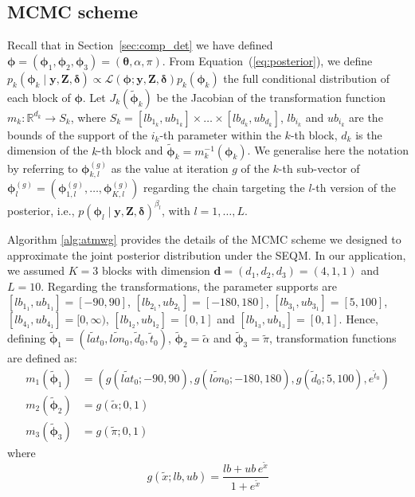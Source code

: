 \documentclass[final]{statsoc}
\begin{document}
\renewcommand\thefigure{S\arabic{figure}}
\setcounter{figure}{0}    
%
\begin{appendix}
    \section{MCMC scheme}\label{sec:app_alg}
    Recall that in Section~\ref*{sec:comp_det} we have defined $\bm{\phi} = (\bm{\phi}_{1},\bm{\phi}_{2},\bm{\phi}_{3}) =(\bm{\theta},\alpha,\pi)$. From Equation~(\ref*{eq:posterior}), we define $p_{k}(\bm{\phi}_{k} \mid \mathbf{y}, \mathbf{Z}, \bm{\delta}) \propto \mathcal{L}(\bm{\phi}; \mathbf{y}, \mathbf{Z}, \bm{\delta}) p_{k}(\bm{\phi}_{k})$ the full conditional distribution of each block of $\bm{\phi}$. Let $J_k\left(\widetilde{\bm{\phi}}_{k}\right)$ be the Jacobian of the transformation function $m_{k}: \mathbb{R}^{d_{k}} \rightarrow S_{k}$, where $S_{k} = [lb_{1_{k}},ub_{1_{k}}] \times \dots \times [lb_{d_{k}},ub_{d_{k}}]$, $lb_{i_{k}}$ and $ub_{i_{k}}$ are the bounds of the support of the $i_{k}$-th parameter within the $k$-th block, $d_{k}$ is the dimension of the $k$-th block and $\widetilde{\bm{\phi}}_{k} = m_{k}^{-1}\left(\bm{\phi}_{k}\right)$.
    We generalise here the notation by referring to $\bm{\phi}_{k,l}^{(g)}$ as the value at iteration $g$ of the $k$-th sub-vector of $\bm{\phi}_{l}^{(g)} = \left(\bm{\phi}_{1,l}^{(g)},\dots,\bm{\phi}_{K,l}^{(g)}\right)$ regarding the chain targeting the $l$-th version of the posterior, i.e., $p\left(\bm{\phi}_{l} \mid \mathbf{y}, \mathbf{Z}, \bm{\delta}\right)^{\beta_{l}}$, with $l=1,\dots,L$.
    
    Algorithm \ref{alg:atmwg} provides the details of the MCMC scheme we designed to approximate the joint posterior distribution under the SEQM. 
    In our application, we assumed $K = 3$ blocks with dimension $\mathbf{d} = (d_{1},d_{2},d_{3}) = (4,1,1)$  and  $L=10$. 
    Regarding the transformations, the parameter supports are $[lb_{1_{1}},ub_{1_{1}}] = [-90,90]$, $[lb_{2_{1}},ub_{2_{1}}] = [-180,180]$, $[lb_{3_{1}},ub_{3_{1}}] = [5,100]$, $[lb_{4_{1}},ub_{4_{1}}] = [0,\infty)$, $[lb_{1_{2}},ub_{1_{2}}] = [0,1]$ and $[lb_{1_{3}},ub_{1_{3}}] = [0,1]$. Hence, defining $\widetilde{\bm{\phi}}_{1} = \left(\widetilde{lat}_{0},\widetilde{lon}_{0},\tilde{d}_{0},\tilde{t}_{0}\right)$, $\widetilde{\bm{\phi}}_{2} = \widetilde{\alpha}$ and $\widetilde{\bm{\phi}}_{3} = \widetilde{\pi}$, transformation functions are defined as:
    \begin{align*}
        m_{1}\left(\widetilde{\bm{\phi}}_{1}\right) &= \left(g\left(\widetilde{lat}_{0};-90,90\right),g\left(\widetilde{lon}_{0};-180,180\right),g\left(\tilde{d}_{0};5,100\right),e^{\tilde{t}_{0}}\right) \\
        m_{2}\left(\widetilde{\bm{\phi}}_{2}\right) &= g\left(\widetilde{\alpha};0,1\right) \\
        m_{3}\left(\widetilde{\bm{\phi}}_{3}\right) &= g\left(\widetilde{\pi};0,1\right)
    \end{align*}
    where 
    \begin{equation*}
        g(\widetilde{x};lb,ub)= \frac{lb + ub \, e^{\widetilde{x}}}{1 + e^{\widetilde{x}}}
    \end{equation*}
    

\end{appendix}
\end{document}
